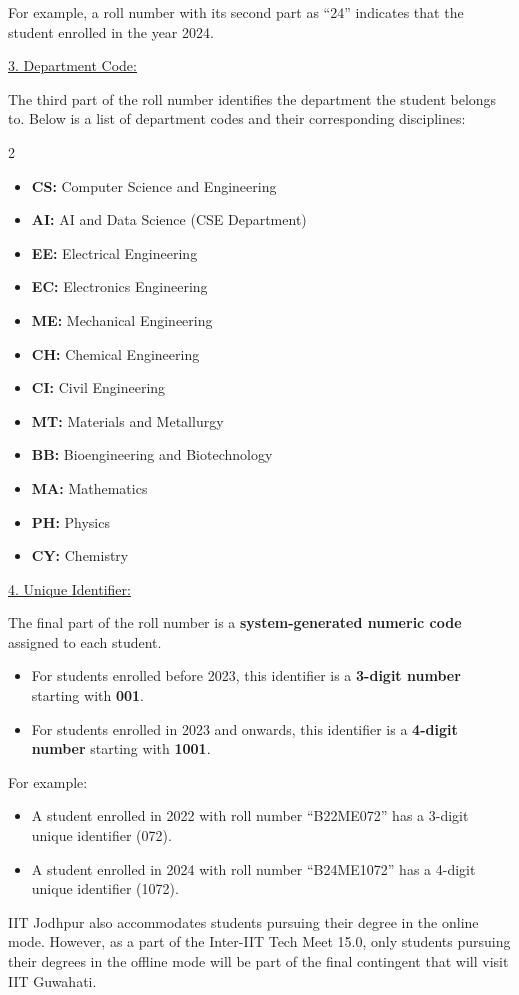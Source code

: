 \documentclass[11pt,a4paper]{article}
\newcommand{\rpart}[1]{\par\medskip\underline{#1}\par}
\begin{document}
For example, a roll number with its second part as ``24'' indicates that the student enrolled in the year 2024.

\rpart{3. Department Code:}
The third part of the roll number identifies the department the student belongs to. Below is a list of department codes and their corresponding disciplines:
\begin{multicols}{2}\raggedright
\begin{itemize}
  \item \textbf{CS:} Computer Science and Engineering
  \item \textbf{AI:} AI and Data Science (CSE Department)
  \item \textbf{EE:} Electrical Engineering
  \item \textbf{EC:} Electronics Engineering
  \item \textbf{ME:} Mechanical Engineering
  \item \textbf{CH:} Chemical Engineering
  \item \textbf{CI:} Civil Engineering
  \item \textbf{MT:} Materials and Metallurgy
  \item \textbf{BB:} Bioengineering and Biotechnology
  \item \textbf{MA:} Mathematics
  \item \textbf{PH:} Physics
  \item \textbf{CY:} Chemistry
\end{itemize}
\end{multicols}

\rpart{4. Unique Identifier:}
The final part of the roll number is a \textbf{system-generated numeric code} assigned to each student.
\begin{itemize}
  \item For students enrolled before 2023, this identifier is a \textbf{3-digit number} starting with \textbf{001}.
  \item For students enrolled in 2023 and onwards, this identifier is a \textbf{4-digit number} starting with \textbf{1001}.
\end{itemize}

For example:
\begin{itemize}
  \item A student enrolled in 2022 with roll number ``B22ME072'' has a 3-digit unique identifier (072).
  \item A student enrolled in 2024 with roll number ``B24ME1072'' has a 4-digit unique identifier (1072).
\end{itemize}

IIT Jodhpur also accommodates students pursuing their degree in the online mode. However, as a part of the Inter-IIT Tech Meet 15.0, only students pursuing their degrees in the offline mode will be part of the final contingent that will visit IIT Guwahati.
\end{document}
